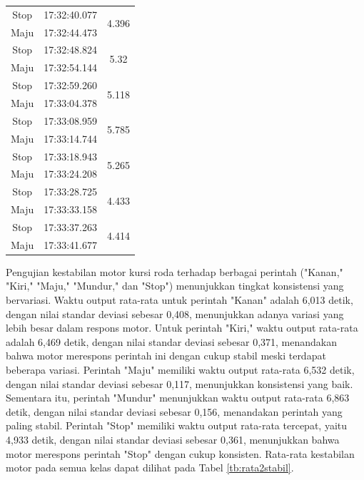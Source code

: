 \begin{longtable}{|c|c|c|}
  Stop           & 17:32:40.077        & \multirow{2}{*}{4.396}  \\ \cline{1-2}
  Maju           & 17:32:44.473        &                         \\ \hline
  Stop           & 17:32:48.824        & \multirow{2}{*}{5.32}   \\ \cline{1-2}
  Maju           & 17:32:54.144        &                         \\ \hline
  Stop           & 17:32:59.260        & \multirow{2}{*}{5.118}  \\ \cline{1-2}
  Maju           & 17:33:04.378        &                         \\ \hline
  Stop           & 17:33:08.959        & \multirow{2}{*}{5.785}  \\ \cline{1-2}
  Maju           & 17:33:14.744        &                         \\ \hline
  Stop           & 17:33:18.943        & \multirow{2}{*}{5.265}  \\ \cline{1-2}
  Maju           & 17:33:24.208        &                         \\ \hline
  Stop           & 17:33:28.725        & \multirow{2}{*}{4.433}  \\ \cline{1-2}
  Maju           & 17:33:33.158        &                         \\ \hline
  Stop           & 17:33:37.263        & \multirow{2}{*}{4.414}  \\ \cline{1-2}
  Maju           & 17:33:41.677        &                         \\ \hline
\end{longtable}

Pengujian kestabilan motor kursi roda terhadap berbagai perintah ("Kanan," "Kiri," "Maju," "Mundur," dan "Stop") menunjukkan tingkat konsistensi yang bervariasi. Waktu output rata-rata untuk perintah "Kanan" adalah 6,013 detik, dengan nilai standar deviasi sebesar 0,408, menunjukkan adanya variasi yang lebih besar dalam respons motor. Untuk perintah "Kiri," waktu output rata-rata adalah 6,469 detik, dengan nilai standar deviasi sebesar 0,371, menandakan bahwa motor merespons perintah ini dengan cukup stabil meski terdapat beberapa variasi. Perintah "Maju" memiliki waktu output rata-rata 6,532 detik, dengan nilai standar deviasi sebesar 0,117, menunjukkan konsistensi yang baik. Sementara itu, perintah "Mundur" menunjukkan waktu output rata-rata 6,863 detik, dengan nilai standar deviasi sebesar 0,156, menandakan perintah yang paling stabil. Perintah "Stop" memiliki waktu output rata-rata tercepat, yaitu 4,933 detik, dengan nilai standar deviasi sebesar 0,361, menunjukkan bahwa motor merespons perintah "Stop" dengan cukup konsisten. Rata-rata kestabilan motor pada semua kelas dapat dilihat pada Tabel \ref{tb:rata2stabil}.

